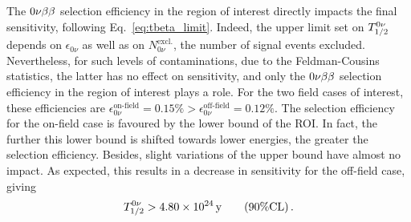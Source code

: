 The $0\nu\beta\beta$ selection efficiency in the region of interest directly impacts the final sensitivity, following Eq.~\eqref{eq:tbeta_limit}.
Indeed, the upper limit set on $T_{1/2}^{0\nu}$ depends on $\epsilon_{0\nu}$ as well as on $N_{0\nu}^{\text{excl.}}$, the number of signal events excluded.
Nevertheless, for such levels of contaminations, due to the Feldman-Cousins statistics, the latter has no effect on sensitivity, and only the $0\nu\beta\beta$ selection efficiency in the region of interest plays a role.
For the two field cases of interest, these efficiencies are $\epsilon_{0\nu}^{\text{on-field}}=0.15\%>\epsilon_{0\nu}^{\text{off-field}}=0.12\%$.
The selection efficiency for the on-field case is favoured by the lower bound of the ROI.
In fact, the further this lower bound is shifted towards lower energies, the greater the selection efficiency.
Besides, slight variations of the upper bound have almost no impact.
As expected, this results in a decrease in sensitivity for the off-field case, giving
\begin{equation}
T_{1/2}^{0\nu} > 4.80\times 10^{24}\,\text{y}\qquad (90\% \text{CL})\,.
\end{equation}

